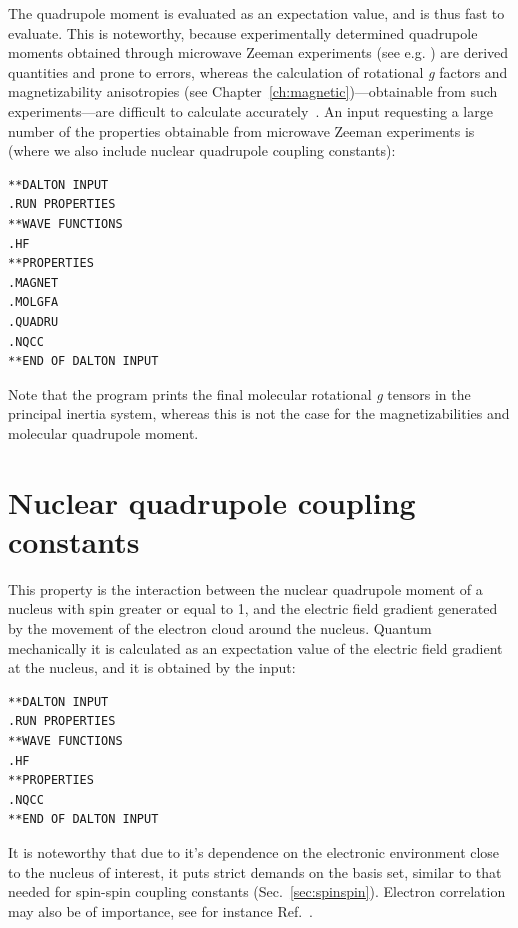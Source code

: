 The quadrupole moment is evaluated as an expectation value, and is
thus fast to evaluate. This is noteworthy, because experimentally
determined quadrupole moments obtained through microwave Zeeman experiments
(see e.g.  \cite{whmklwhfjcp48,jsdhszna46}) are derived
quantities and prone to errors,
whereas the calculation of rotational {\em g} factors and magnetizability
anisotropies (see Chapter~\ref{ch:magnetic})---obtainable from such
experiments---are difficult to calculate accurately~\cite{krthcpl264}. An input
requesting a large number of the properties obtainable from microwave
Zeeman experiments is (where we also include nuclear quadrupole
coupling constants):

\begin{verbatim}
**DALTON INPUT
.RUN PROPERTIES
**WAVE FUNCTIONS
.HF
**PROPERTIES
.MAGNET
.MOLGFA
.QUADRU
.NQCC
**END OF DALTON INPUT
\end{verbatim}

Note that the program prints the final molecular rotational {\em g}
tensors in the
principal inertia system, whereas this is not the case for the
magnetizabilities and molecular quadrupole moment.

\section{Nuclear quadrupole coupling constants}

This property is the interaction between the nuclear quadrupole moment
of a nucleus with spin greater or equal to 1, and the electric field gradient
generated by the movement of the electron cloud around the nucleus.
Quantum mechanically it is calculated as an expectation value of the electric
field gradient  at the nucleus, and it is obtained by the input:

\begin{verbatim}
**DALTON INPUT
.RUN PROPERTIES
**WAVE FUNCTIONS
.HF
**PROPERTIES
.NQCC
**END OF DALTON INPUT
\end{verbatim}

It is noteworthy that due to it's dependence on the
electronic environment close to the nucleus of interest, it puts strict
demands on the basis set, similar to that needed for spin-spin
coupling
constants (Sec.~\ref{sec:spinspin}). Electron correlation may also be of
importance, see for instance Ref.~\cite{mjssocpjthkrcpl243}.



